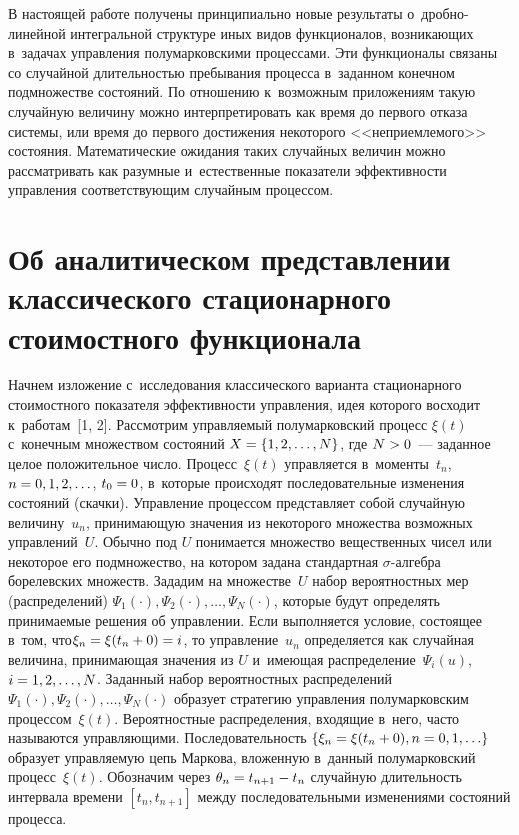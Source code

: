 \begin{multicols}{2}
В настоящей работе получены принципиально новые результаты о~дроб\-но-ли\-ней\-ной 
интегральной структуре иных видов функционалов, возникающих в~задачах управ\-ле\-ния 
полумарковскими процессами. Эти функционалы связаны со случайной длительностью 
пребывания процесса в~заданном конечном подмножестве состояний. По отношению 
к~возможным приложениям такую случайную величину можно интерпретировать как время 
до первого отказа сис\-те\-мы, или время до первого достижения некоторого 
<<неприемлемого>> состояния. Математические ожидания таких случайных величин можно 
рассматривать как разумные и~естественные показатели эффективности управления 
соответствующим случайным процессом.


\section{Об аналитическом представлении классического стационарного 
стоимостного функционала}

Начнем изложение с~исследования классического варианта стационарного 
стоимостного показателя эффективности управления, идея которого восходит 
к~работам~[1, 2]. Рас\-смот\-рим управ\-ля\-емый полумарковский процесс $\xi(t)$ 
с~конечным множеством со\-сто\-яний $X\hm=\{1,2,\ldots ,N\}$, где $N\hm>0$~--- заданное целое 
положительное чис\-ло. Процесс~$\xi(t)$ управ\-ля\-ет\-ся в~моменты~$t_n$, 
$n\hm=0,1,2,\ldots$, $t_0\hm=0$, в~которые происходят последовательные изменения состояний 
(скачки). Управление процессом представляет собой случайную величину~$u_n$, 
принимающую значения из некоторого множества возможных управлений~$U$. Обычно 
под $U$ понимается множество вещественных чисел или некоторое его подмножество, 
на котором задана стандартная $\sigma$-ал\-геб\-ра борелевских множеств. Зададим на 
множестве~$U$ набор вероятностных мер (распределений) 
$\Psi_1(\cdot),\Psi_2(\cdot),\ldots,\Psi_N(\cdot)$, которые будут определять 
принимаемые решения об управ\-ле\-нии. Если выполняется условие, состоящее в~том, 
что\linebreak $\xi_n\hm=\xi(t_n+0)\hm=i$, то управ\-ле\-ние~$u_n$ определяется как случайная 
величина, принимающая значения из $U$ и~имеющая распределение~$\Psi_i(u)$, 
$i\hm=1,2,\ldots,N$. Заданный набор вероятностных \mbox{распределений} 
$\Psi_1(\cdot),\Psi_2(\cdot),\dots,\Psi_N(\cdot)$ образует стратегию управ\-ле\-ния 
полумарковским процессом~$\xi(t)$. Вероятностные распределения, входящие в~него, 
часто называются управ\-ля\-ющи\-ми. Последовательность $\{\xi_n\hm=\xi(t_n+0), 
n\hm=0, 1, \ldots\}$ образует управ\-ля\-емую цепь Маркова, вложенную в~данный 
полумарковский процесс~$\xi(t)$. Обозначим через $\theta_n\hm=t_{n+1}\hm-t_n$ 
случайную длительность интервала времени $[t_n, t_{n+1}]$ между 
последовательными изменениями состояний процесса.


\end{multicols}
